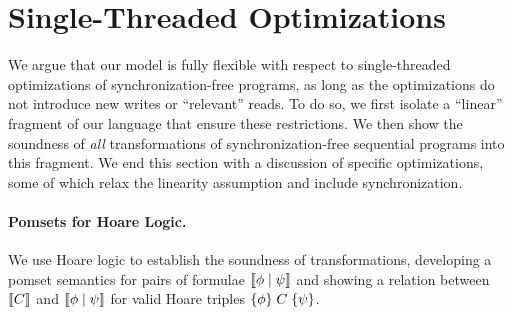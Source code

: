 \section{Single-Threaded Optimizations}
\label{sec:opt}

We argue that our model is fully flexible with respect to single-threaded
optimizations of synchronization-free programs, as long as the
optimizations do not introduce new writes or ``relevant'' reads.  To do so, we
first isolate a ``linear'' fragment of our language that ensure these
restrictions.  We then show the soundness of {\em all} transformations of
synchronization-free sequential programs into this fragment.  
%
We end this section with a discussion of specific optimizations, some of
which relax the linearity assumption and include synchronization.

\paragraph{Pomsets for Hoare Logic.}
We use Hoare logic to establish the soundness of transformations, developing
a pomset semantics for pairs of formulae $\llbracket\phi\mid\psi\rrbracket$ and showing
a relation between $\llbracket C\rrbracket$ and $\llbracket\phi\mid\psi\rrbracket$ for valid Hoare
triples $\{\phi\}\allowbreak\;C\;\allowbreak\{\psi\}$.

